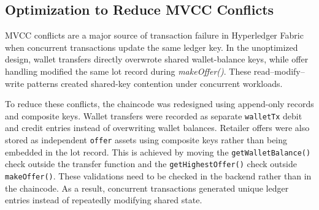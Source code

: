 \documentclass[manuscript,screen,nofonts]{acmart}
\begin{document}
\begin{table}[h]
	\centering
	\caption{Runtime Resource Utilization of Smart Contract and Retrieval Functions at 500 TPS Load}
	\label{tab:resource-combined}
\end{table}
	
\subsection{Optimization to Reduce MVCC Conflicts}

MVCC conflicts are a major source of transaction failure in Hyperledger Fabric when concurrent transactions update the same ledger key. In the unoptimized design, wallet transfers directly overwrote shared wallet-balance keys, while offer handling modified the same lot record during \textit{makeOffer()}. These read--modify--write patterns created shared-key contention under concurrent workloads.

To reduce these conflicts, the chaincode was redesigned using append-only records and composite keys. Wallet transfers were recorded as separate \texttt{walletTx} debit and credit entries instead of overwriting wallet balances. Retailer offers were also stored as independent \texttt{offer} assets using composite keys rather than being embedded in the lot record. This is achieved by moving the \texttt{getWalletBalance()} check outside the transfer function and the \texttt{getHighestOffer()} check outside \texttt{makeOffer()}. These validations need to be checked in the backend rather than in the chaincode. As a result, concurrent transactions generated unique ledger entries instead of repeatedly modifying shared state.
\end{document}
